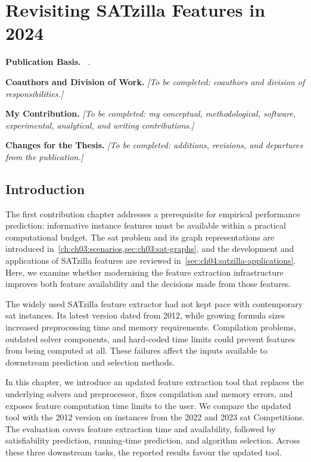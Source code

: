 \chapter{Revisiting SATzilla Features in 2024}\label{ch:ch04:rev_SATzilla}

\begingroup\small
\noindent\textbf{Publication Basis.} ~\citep{ShaHoo24}.\par
\noindent\textbf{Coauthors and Division of Work.} \emph{[To be completed: coauthors and division of responsibilities.]}\par
\noindent\textbf{My Contribution.} \emph{[To be completed: my conceptual, methodological, software, experimental, analytical, and writing contributions.]}\par
\noindent\textbf{Changes for the Thesis.} \emph{[To be completed: additions, revisions, and departures from the publication.]}\par
\endgroup\medskip

\section{Introduction}
\label{sec:ch04:intro}

The first contribution chapter addresses a prerequisite for empirical performance prediction: informative instance features must be available within a practical computational budget. The \gls{sat} problem and its graph representations are introduced in~\cref{ch:ch03:scenarios,sec:ch03:sat-graphs}, and the development and applications of SATzilla features are reviewed in~\cref{sec:ch04:satzilla-applications}. Here, we examine whether modernising the feature extraction infrastructure improves both feature availability and the decisions made from those features.

The widely used SATzilla feature extractor had not kept pace with contemporary \gls{sat} instances. Its latest version dated from 2012, while growing formula sizes increased preprocessing time and memory requirements. Compilation problems, outdated solver components, and hard-coded time limits could prevent features from being computed at all. These failures affect the inputs available to downstream prediction and selection methods.

In this chapter, we introduce an updated feature extraction tool that replaces the underlying solvers and preprocessor, fixes compilation and memory errors, and exposes feature computation time limits to the user. We compare the updated tool with the 2012 version on instances from the 2022 and 2023 \gls{sat} Competitions. The evaluation covers feature extraction time and availability, followed by satisfiability prediction, running-time prediction, and algorithm selection. Across these three downstream tasks, the reported results favour the updated tool.

